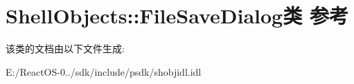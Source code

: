\hypertarget{class_shell_objects_1_1_file_save_dialog}{}\section{Shell\+Objects\+:\+:File\+Save\+Dialog类 参考}
\label{class_shell_objects_1_1_file_save_dialog}


该类的文档由以下文件生成\+:\begin{DoxyCompactItemize}
\item 
E\+:/\+React\+O\+S-\/0../sdk/include/psdk/shobjidl.\+idl\end{DoxyCompactItemize}
